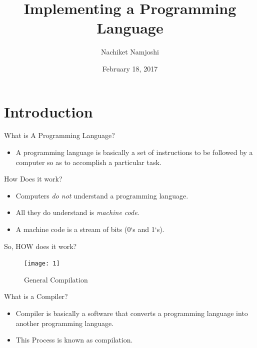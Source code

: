 \documentclass[dvipsnames]{beamer}
\author{Nachiket Namjoshi}
\title{Implementing a Programming Language}
\date{February 18, 2017}
\begin{document}
\begin{frame}
\titlepage
\end{frame}

\section{Introduction}

\begin{frame}{What is A Programming Language?}
\begin{itemize}
\item A \alert{programming language} is basically a set of instructions to be followed by a computer so as to accomplish a particular task.
\end{itemize}
\end{frame}

\begin{frame}{How Does it work?}
\begin{itemize}
\item Computers \emph{do not} understand a programming language.
\item All they do understand is \emph{machine code}.
\item A machine code is a stream of bits (0‘s and 1‘s).
\end{itemize}
\end{frame}
\begin{frame}{So, HOW does it work?}
\begin{figure}
	\texttt{[image: 1]}
	\caption{General Compilation}
\end{figure}
\end{frame}

\begin{frame}{What is a Compiler?}
\begin{itemize}
\item Compiler is basically a \alert{software} that converts a programming language into another programming language.
\item This Process is known as \alert{compilation}.
\end{itemize}
\end{frame}
\end{document}
